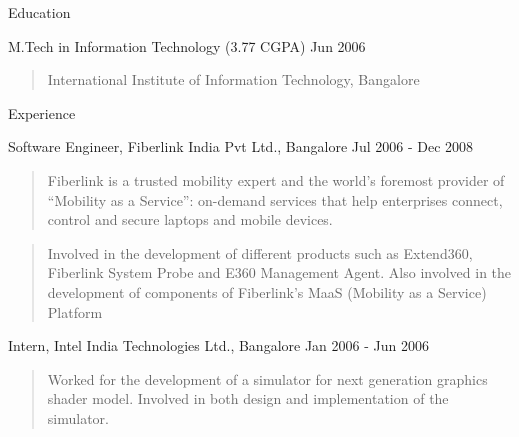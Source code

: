 \documentclass{resume}
\author{Ashish Tulsian}
\begin{document}
 \maketitle

\begin{category}{Education}{}

    \item {\topic M.Tech in Information Technology}
        {\footnotesize(3.77 CGPA)}
        {\period Jun 2006}
        \begin{quote}
            International Institute of Information Technology, Bangalore
        \end{quote}

\end{category}


\begin{category}{Experience}{}

    \item {\topic Software Engineer,} Fiberlink India Pvt Ltd., Bangalore
        {\period Jul 2006 - Dec 2008}
        \begin{quote}
            Fiberlink is a trusted mobility expert and the world’s foremost
            provider of “Mobility as a Service”: on-demand services that help
            enterprises connect, control and secure laptops and mobile devices.
        \end{quote}
        \begin{quote}
            Involved in the development of different products such as
            Extend360, Fiberlink System Probe and E360 Management Agent. Also
            involved in the development of components of Fiberlink’s MaaS
            (Mobility as a Service) Platform
        \end{quote}

    \item {\topic Intern,} Intel India Technologies Ltd., Bangalore
        {\period Jan 2006 - Jun 2006}
        \begin{quote}
            Worked for the development of a simulator for next generation
            graphics shader model. Involved in both design and implementation
            of the simulator.
        \end{quote}

\end{category}
\end{document}
